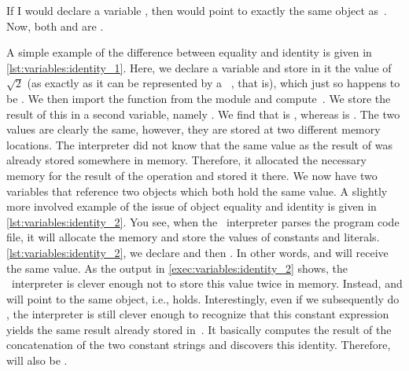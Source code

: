 If I would declare a variable , then  would point to exactly the same  object as~.
Now, both  and  are .

A simple example of the difference between equality and identity is given in \cref{lst:variables:identity_1}.
Here, we declare a  variable and store in it the value of~$\sqrt{2}$ (as exactly as it can be represented by a \python\ , that is), which just so happens to be .
We then import the function  from the  module and compute~.
We store the result of this in a second variable, namely .
We find that  is , whereas  is .
The two values are clearly the same, however, they are stored at two different memory locations.
The interpreter did not know that the same value as the result of  was already stored somewhere in memory.
Therefore, it allocated the necessary memory for the result of the  operation and stored it there.
We now have two variables that reference two objects which both hold the same value.%
%
%
%
A slightly more involved example of the issue of object equality and identity is given in \cref{lst:variables:identity_2}.
You see, when the \python\ interpreter parses the program code file, it will allocate the memory and store the values of constants and literals.
\cref{lst:variables:identity_2}, we declare  and then .
In other words,  and  will receive the same value.
As the output in \cref{exec:variables:identity_2} shows, the \python\ interpreter is clever enough not to store this value twice in memory.
Instead,  and  will point to the same object, i.e.,  holds.
Interestingly, even if we subsequently do , the interpreter is still clever enough to recognize that this constant expression yields the same result already stored in~.
It basically computes the result of the concatenation of the two constant strings and discovers this identity.
Therefore,  will also be .

